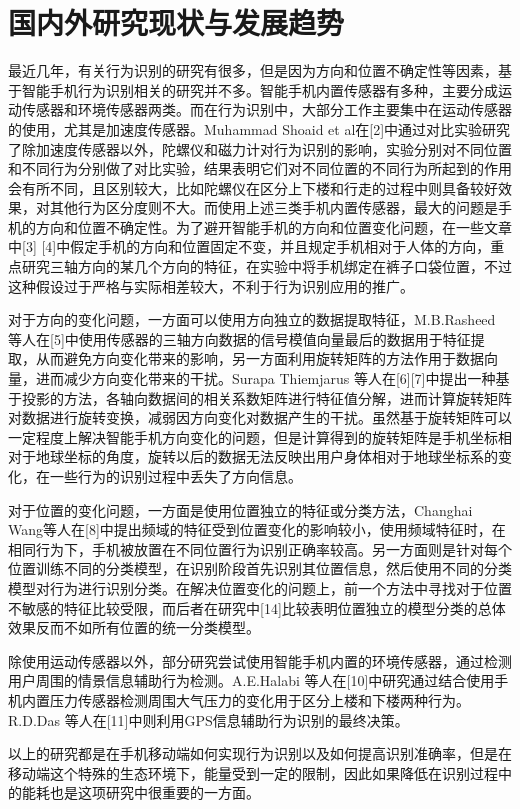 \section{国内外研究现状与发展趋势}
\par 最近几年，有关行为识别的研究有很多，但是因为方向和位置不确定性等因素，基于智能手机行为识别相关的研究并不多。智能手机内置传感器有多种，主要分成运动传感器和环境传感器两类。而在行为识别中，大部分工作主要集中在运动传感器的使用，尤其是加速度传感器。Muhammad Shoaid et al在[2]中通过对比实验研究了除加速度传感器以外，陀螺仪和磁力计对行为识别的影响，实验分别对不同位置和不同行为分别做了对比实验，结果表明它们对不同位置的不同行为所起到的作用会有所不同，且区别较大，比如陀螺仪在区分上下楼和行走的过程中则具备较好效果，对其他行为区分度则不大。而使用上述三类手机内置传感器，最大的问题是手机的方向和位置不确定性。为了避开智能手机的方向和位置变化问题，在一些文章中[3] [4]中假定手机的方向和位置固定不变，并且规定手机相对于人体的方向，重点研究三轴方向的某几个方向的特征，在实验中将手机绑定在裤子口袋位置，不过这种假设过于严格与实际相差较大，不利于行为识别应用的推广。
\par 对于方向的变化问题，一方面可以使用方向独立的数据提取特征，M.B.Rasheed 等人在[5]中使用传感器的三轴方向数据的信号模值向量最后的数据用于特征提取，从而避免方向变化带来的影响，另一方面利用旋转矩阵的方法作用于数据向量，进而减少方向变化带来的干扰。Surapa Thiemjarus 等人在[6][7]中提出一种基于投影的方法，各轴向数据间的相关系数矩阵进行特征值分解，进而计算旋转矩阵对数据进行旋转变换，减弱因方向变化对数据产生的干扰。虽然基于旋转矩阵可以一定程度上解决智能手机方向变化的问题，但是计算得到的旋转矩阵是手机坐标相对于地球坐标的角度，旋转以后的数据无法反映出用户身体相对于地球坐标系的变化，在一些行为的识别过程中丢失了方向信息。
\par 对于位置的变化问题，一方面是使用位置独立的特征或分类方法，Changhai Wang等人在[8]中提出频域的特征受到位置变化的影响较小，使用频域特征时，在相同行为下，手机被放置在不同位置行为识别正确率较高。另一方面则是针对每个位置训练不同的分类模型，在识别阶段首先识别其位置信息，然后使用不同的分类模型对行为进行识别分类。在解决位置变化的问题上，前一个方法中寻找对于位置不敏感的特征比较受限，而后者在研究中[14]比较表明位置独立的模型分类的总体效果反而不如所有位置的统一分类模型。
\par 除使用运动传感器以外，部分研究尝试使用智能手机内置的环境传感器，通过检测用户周围的情景信息辅助行为检测。A.E.Halabi 等人在[10]中研究通过结合使用手机内置压力传感器检测周围大气压力的变化用于区分上楼和下楼两种行为。R.D.Das 等人在[11]中则利用GPS信息辅助行为识别的最终决策。
\par 以上的研究都是在手机移动端如何实现行为识别以及如何提高识别准确率，但是在移动端这个特殊的生态环境下，能量受到一定的限制，因此如果降低在识别过程中的能耗也是这项研究中很重要的一方面。
